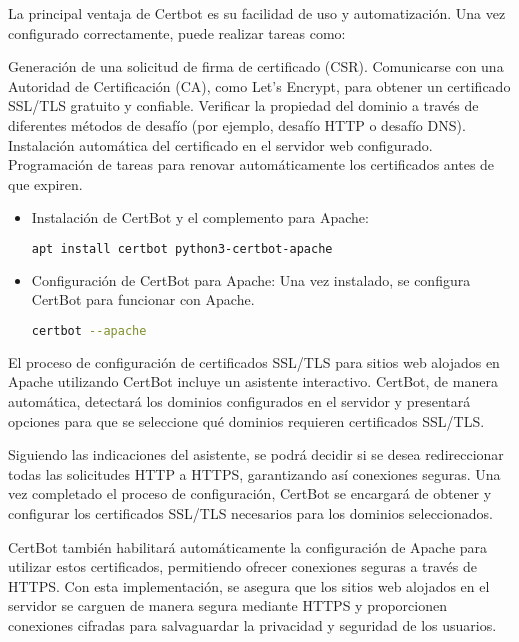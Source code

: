 \begin{enumerate}
			La principal ventaja de Certbot es su facilidad de uso y automatización. Una vez configurado correctamente, puede realizar tareas como:
			
			Generación de una solicitud de firma de certificado (CSR).
			Comunicarse con una Autoridad de Certificación (CA), como Let's Encrypt, para obtener un certificado SSL/TLS gratuito y confiable.
			Verificar la propiedad del dominio a través de diferentes métodos de desafío (por ejemplo, desafío HTTP o desafío DNS).
			Instalación automática del certificado en el servidor web configurado.
			Programación de tareas para renovar automáticamente los certificados antes de que expiren.
			
	
		\begin{itemize}
			\item Instalación de CertBot y el complemento para Apache:
			\begin{lstlisting}[language=Bash,caption=CertBot]
			apt install certbot python3-certbot-apache
			\end{lstlisting}
			
			\item Configuración de CertBot para Apache:	Una vez instalado, se configura CertBot para funcionar con Apache.
			
			\begin{lstlisting}[language=Bash,caption=CertBot]
			certbot --apache
			\end{lstlisting}
		
			\end{itemize}	
		
			El proceso de configuración de certificados SSL/TLS para sitios web alojados en Apache utilizando CertBot incluye un asistente interactivo. CertBot, de manera automática, detectará los dominios configurados en el servidor y presentará opciones para que se seleccione qué dominios requieren certificados SSL/TLS.
			
			Siguiendo las indicaciones del asistente, se podrá decidir si se desea redireccionar todas las solicitudes HTTP a HTTPS, garantizando así conexiones seguras. Una vez completado el proceso de configuración, CertBot se encargará de obtener y configurar los certificados SSL/TLS necesarios para los dominios seleccionados.
			
			CertBot también habilitará automáticamente la configuración de Apache para utilizar estos certificados, permitiendo ofrecer conexiones seguras a través de HTTPS. Con esta implementación, se asegura que los sitios web alojados en el servidor se carguen de manera segura mediante HTTPS y proporcionen conexiones cifradas para salvaguardar la privacidad y seguridad de los usuarios.
			

\end{enumerate}
